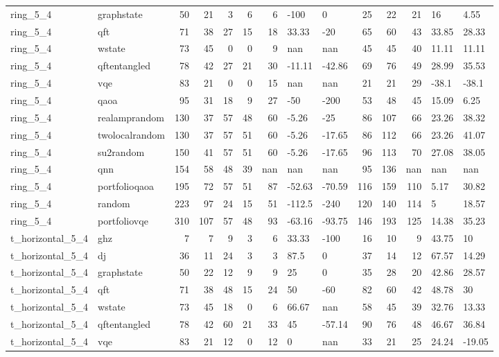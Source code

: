\begin{longtable}{llrrrrrllrrrll}
ring\_5\_4 & graphstate & 50 & 21 & 3 & 6 & 6 & -100 & 0 & 25 & 22 & 21 & 16 & 4.55 \\
ring\_5\_4 & qft & 71 & 38 & 27 & 15 & 18 & 33.33 & -20 & 65 & 60 & 43 & 33.85 & 28.33 \\
ring\_5\_4 & wstate & 73 & 45 & 0 & 0 & 9 & nan & nan & 45 & 45 & 40 & 11.11 & 11.11 \\
ring\_5\_4 & qftentangled & 78 & 42 & 27 & 21 & 30 & -11.11 & -42.86 & 69 & 76 & 49 & 28.99 & 35.53 \\
ring\_5\_4 & vqe & 83 & 21 & 0 & 0 & 15 & nan & nan & 21 & 21 & 29 & -38.1 & -38.1 \\
ring\_5\_4 & qaoa & 95 & 31 & 18 & 9 & 27 & -50 & -200 & 53 & 48 & 45 & 15.09 & 6.25 \\
ring\_5\_4 & realamprandom & 130 & 37 & 57 & 48 & 60 & -5.26 & -25 & 86 & 107 & 66 & 23.26 & 38.32 \\
ring\_5\_4 & twolocalrandom & 130 & 37 & 57 & 51 & 60 & -5.26 & -17.65 & 86 & 112 & 66 & 23.26 & 41.07 \\
ring\_5\_4 & su2random & 150 & 41 & 57 & 51 & 60 & -5.26 & -17.65 & 96 & 113 & 70 & 27.08 & 38.05 \\
ring\_5\_4 & qnn & 154 & 58 & 48 & 39 & nan & nan & nan & 95 & 136 & nan & nan & nan \\
ring\_5\_4 & portfolioqaoa & 195 & 72 & 57 & 51 & 87 & -52.63 & -70.59 & 116 & 159 & 110 & 5.17 & 30.82 \\
ring\_5\_4 & random & 223 & 97 & 24 & 15 & 51 & -112.5 & -240 & 120 & 140 & 114 & 5 & 18.57 \\
ring\_5\_4 & portfoliovqe & 310 & 107 & 57 & 48 & 93 & -63.16 & -93.75 & 146 & 193 & 125 & 14.38 & 35.23 \\
t\_horizontal\_5\_4 & ghz & 7 & 7 & 9 & 3 & 6 & 33.33 & -100 & 16 & 10 & 9 & 43.75 & 10 \\
t\_horizontal\_5\_4 & dj & 36 & 11 & 24 & 3 & 3 & 87.5 & 0 & 37 & 14 & 12 & 67.57 & 14.29 \\
t\_horizontal\_5\_4 & graphstate & 50 & 22 & 12 & 9 & 9 & 25 & 0 & 35 & 28 & 20 & 42.86 & 28.57 \\
t\_horizontal\_5\_4 & qft & 71 & 38 & 48 & 15 & 24 & 50 & -60 & 82 & 60 & 42 & 48.78 & 30 \\
t\_horizontal\_5\_4 & wstate & 73 & 45 & 18 & 0 & 6 & 66.67 & nan & 58 & 45 & 39 & 32.76 & 13.33 \\
t\_horizontal\_5\_4 & qftentangled & 78 & 42 & 60 & 21 & 33 & 45 & -57.14 & 90 & 76 & 48 & 46.67 & 36.84 \\
t\_horizontal\_5\_4 & vqe & 83 & 21 & 12 & 0 & 12 & 0 & nan & 33 & 21 & 25 & 24.24 & -19.05 \\

\end{longtable}
